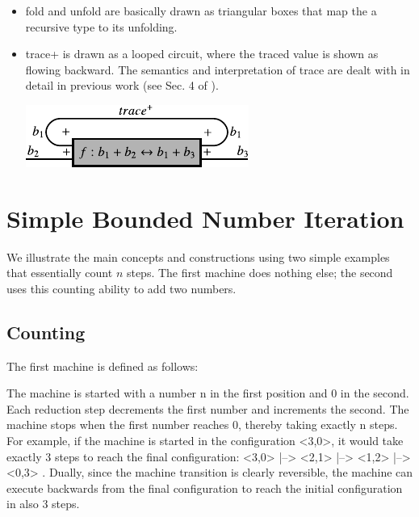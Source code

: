 \documentclass{llncs}
\begin{document}
\begin{itemize}
\item {{fold}} and {{unfold}} are basically drawn as triangular boxes
  that map the a recursive type to its unfolding.

\item {{trace+}} is drawn as a looped circuit, where the traced value
  is shown as flowing backward. The semantics and interpretation of
  {{trace}} are dealt with in detail in previous work (see Sec. 4 of
  \cite{infeffects}).

\begin{center}
  \includegraphics{diagrams/thesis/trace_plus.pdf}
\end{center}

\end{itemize}

\section{Simple Bounded Number Iteration}

We illustrate the main concepts and constructions using two simple examples
that essentially count $n$ steps. The first machine does nothing else; the
second uses this counting ability to add two numbers. 

\subsection{Counting}

The first machine is defined as follows:

\begin{multicols}{2}

\end{multicols}

  
\noindent The machine is started with a number {{n}} in the first position
and {{0}} in the second. Each reduction step decrements the first number and
increments the second. The machine stops when the first number reaches 0,
thereby taking exactly {{n}} steps. For example, if the machine is started in
the configuration {{<3,0>}}, it would take exactly 3 steps to reach the final
configuration: {{ <3,0> |--> <2,1> |--> <1,2> |--> <0,3> }}. Dually, since
the machine transition is clearly reversible, the machine can execute
backwards from the final configuration to reach the initial configuration in
also 3 steps. 
\end{document}

